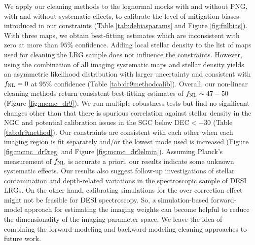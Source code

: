 We apply our cleaning methods to the lognormal mocks with and without PNG, with and without systematic effects, to calibrate the level of mitigation biases introduced in our constraints (Table \ref{tab:debiasparams} and Figure \ref{fig:fnlbias}). With three maps, we obtain best-fitting estimates which are inconsistent with zero at more than $95\%$ confidence. Adding local stellar density to the list of maps used for cleaning the LRG sample does not influence the constraints. However, using the combination of all imaging systematic maps and stellar density yields an asymmetric likelihood distribution with larger uncertainty and consistent with $f_{\rm NL}=0$ at $95\%$ confidence (Table \ref{tab:dr9methodcalib}).  Overall, our non-linear cleaning methods return consistent best-fitting estimates of $f_{\rm NL} \sim 47-50$ (Figure \ref{fig:mcmc_dr9}). We run multiple robustness tests but find no significant changes other than that there is spurious correlation against stellar density in the NGC and potential calibration issues in the SGC below DEC$< -30$ (Table \ref{tab:dr9method}). Our constraints are consistent with each other when each imaging region is fit separately and/or the lowest mode used is increased (Figure \ref{fig:mcmc_dr9reg} and Figure \ref{fig:mcmc_dr9elmin}). Assuming Planck's measurement of $f_{\rm NL}$ is accurate a priori, our results indicate some unknown systematic effects.  Our results also suggest follow-up investigations of stellar contamination and depth-related variations in the spectroscopic sample of DESI LRGs.  On the other hand, calibrating simulations for the over correction effect might not be feasible for DESI spectroscopy. So, a simulation-based forward-model approach for estimating the imaging weights can become helpful to reduce the dimensionality of the imaging parameter space. We leave the idea of combining the forward-modeling and backward-modeling cleaning approaches to future work. %

\clearpage